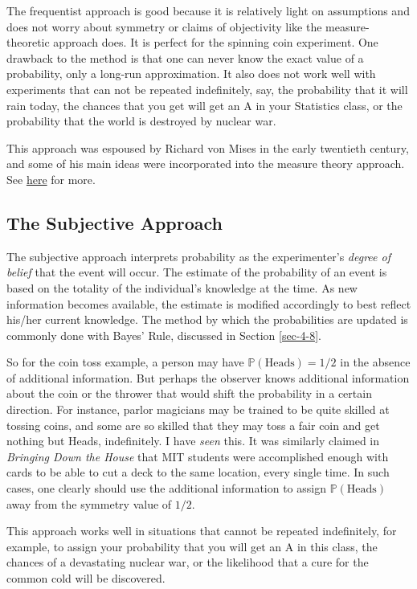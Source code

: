The frequentist approach is good because it is relatively light on
assumptions and does not worry about symmetry or claims of objectivity
like the measure-theoretic approach does. It is perfect for the
spinning coin experiment. One drawback to the method is that one can
never know the exact value of a probability, only a long-run
approximation. It also does not work well with experiments that can
not be repeated indefinitely, say, the probability that it will rain
today, the chances that you get will get an A in your Statistics
class, or the probability that the world is destroyed by nuclear war.

This approach was espoused by Richard von Mises in the early twentieth
century, and some of his main ideas were incorporated into the measure
theory approach. See \href{http://www-history.mcs.st-andrews.ac.uk/Biographies/Mises.html}{here} for more.

\subsection{The Subjective Approach}
\label{sec-4-3-3}

The subjective approach interprets probability as the experimenter's
\emph{degree of belief} that the event will occur. The estimate of the
probability of an event is based on the totality of the individual's
knowledge at the time. As new information becomes available, the
estimate is modified accordingly to best reflect his/her current
knowledge. The method by which the probabilities are updated is
commonly done with Bayes' Rule, discussed in Section \ref{sec-4-8}.

So for the coin toss example, a person may have
\(\mathbb{P}(\mbox{Heads})=1/2\) in the absence of additional
information. But perhaps the observer knows additional information
about the coin or the thrower that would shift the probability in a
certain direction. For instance, parlor magicians may be trained to be
quite skilled at tossing coins, and some are so skilled that they may
toss a fair coin and get nothing but Heads, indefinitely. I have
\emph{seen} this. It was similarly claimed in \emph{Bringing Down the House}
\cite{Mezrich2003} that MIT students were accomplished enough with
cards to be able to cut a deck to the same location, every single
time. In such cases, one clearly should use the additional information
to assign \(\mathbb{P}(\mbox{Heads})\) away from the symmetry value of
\(1/2\).

This approach works well in situations that cannot be repeated
indefinitely, for example, to assign your probability that you will
get an A in this class, the chances of a devastating nuclear war, or
the likelihood that a cure for the common cold will be discovered.

